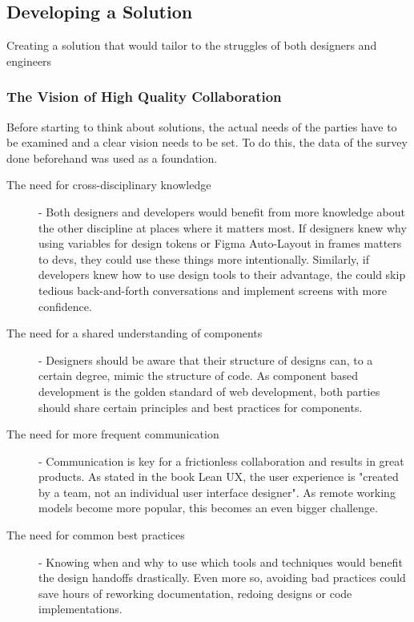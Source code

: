 \newpage
\subsection{Developing a Solution}
Creating a solution that would tailor to the struggles of both designers and engineers 

\subsubsection{The Vision of High Quality Collaboration}
Before starting to think about solutions, the actual needs of the parties have to be examined and a
clear vision needs to be set. To do this, the data of the survey done beforehand was used as a
foundation. 

\begin{description}
    \item[The need for cross-disciplinary knowledge] - Both designers and developers would benefit
    from more knowledge about the other discipline at places where it matters most. If designers
    knew why using variables for design tokens or Figma Auto-Layout in frames matters to devs, they
    could use these things more intentionally. Similarly, if developers knew how to use design tools
    to their advantage, the could skip tedious back-and-forth conversations and implement screens
    with more confidence.
    \item[The need for a shared understanding of components] - Designers should be aware that their
    structure of designs can, to a certain degree, mimic the structure of code. As component based
    development is the golden standard of web development, both parties should share certain
    principles and best practices for components.
    \item[The need for more frequent communication] - Communication is key for a frictionless
    collaboration and results in great products. As stated in the book Lean UX, the user experience
    is "created by a team, not an individual user interface designer".
     As remote working models become more
    popular, this becomes an even bigger challenge. 
    \item[The need for common best practices] - Knowing when and why to use which tools and
    techniques would benefit the design handoffs drastically. Even more so, avoiding bad practices
    could save hours of reworking documentation, redoing designs or code implementations.
\end{description}

